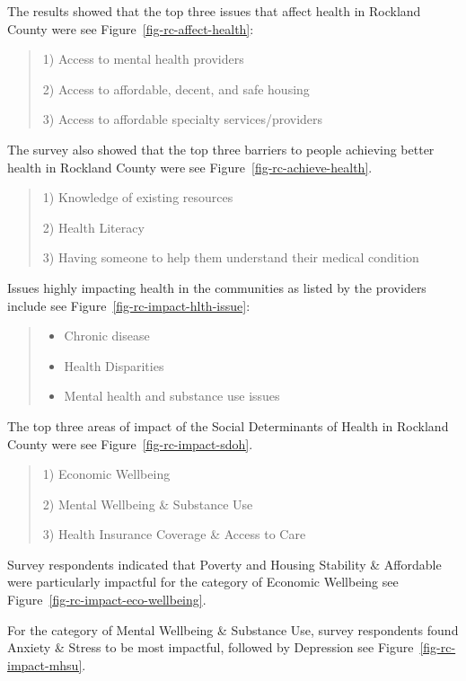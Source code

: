 \documentclass[
  english,
  letterpaper,
]{report}
\begin{document}
The results showed that the top three issues that affect health in
Rockland County were see Figure~\ref{fig-rc-affect-health}:

\begin{quote}
1) Access to mental health providers

2) Access to affordable, decent, and safe housing

3) Access to affordable specialty services/providers
\end{quote}

The survey also showed that the top three barriers to people achieving
better health in Rockland County were see
Figure~\ref{fig-rc-achieve-health}.

\begin{quote}
1) Knowledge of existing resources

2) Health Literacy

3) Having someone to help them understand their medical condition
\end{quote}

Issues highly impacting health in the communities as listed by the
providers include see Figure~\ref{fig-rc-impact-hlth-issue}:

\begin{quote}
\begin{itemize}
\item
  Chronic disease
\item
  Health Disparities
\item
  Mental health and substance use issues
\end{itemize}
\end{quote}

The top three areas of impact of the Social Determinants of Health in
Rockland County were see Figure~\ref{fig-rc-impact-sdoh}.

\begin{quote}
1) Economic Wellbeing

2) Mental Wellbeing \& Substance Use

3) Health Insurance Coverage \& Access to Care
\end{quote}

Survey respondents indicated that Poverty and Housing Stability \&
Affordable were particularly impactful for the category of Economic
Wellbeing see Figure~\ref{fig-rc-impact-eco-wellbeing}.

For the category of Mental Wellbeing \& Substance Use, survey
respondents found Anxiety \& Stress to be most impactful, followed by
Depression see Figure~\ref{fig-rc-impact-mhsu}.
\end{document}
